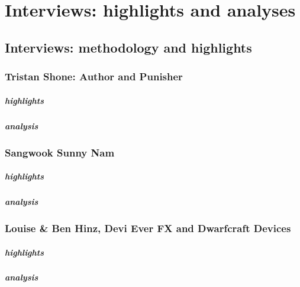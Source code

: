 \chapter{Interviews: highlights and analyses}\label{interviews}
\section{Interviews: methodology and highlights}

\subsection{Tristan Shone: Author and Punisher}

\paragraph{highlights}
\paragraph{analysis}

\subsection{Sangwook Sunny Nam}
\paragraph{highlights}
\paragraph{analysis}

\subsection{Louise \& Ben Hinz, Devi Ever FX and Dwarfcraft Devices}
\paragraph{highlights}
\paragraph{analysis}

